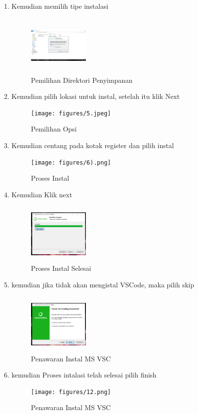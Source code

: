 \begin{enumerate}
    \item Kemudian memilih tipe instalasi
    \begin{figure}[!htbp]
        \centering
        \includegraphics[width=3cm,height=3cm]{figures/4.png}
        \caption{Pemilihan Direktori Penyimpanan}
        \label{Directory}
        \end{figure}

    \item Kemudian pilih lokasi untuk instal, setelah itu klik Next
    \begin{figure}[!htbp]
        \centering
        \texttt{[image: figures/5.jpeg]}
        \caption{Pemilihan Opsi}
        \label{opsi}
        \end{figure}

    \item Kemudian centang pada kotak register dan pilih instal
    \begin{figure}[!htbp]
        \centering
        \texttt{[image: figures/6).png]}
        \caption{Proses Instal}
        \label{Proses}
        \end{figure}

    \item Kemudian Klik next
    \begin{figure}[!htbp]
        \centering
        \includegraphics[width=3cm,height=3cm]{figures/7.png}
        \caption{Proses Instal Selesai}
        \label{Proses}
        \end{figure}

    \item kemudian jika tidak akan mengistal VSCode, maka pilih skip
    \begin{figure}[!htbp]
        \centering
        \includegraphics[width=3cm,height=3cm]{figures/9.png}
        \caption{Penawaran Instal MS VSC}
        \label{offering}
        \end{figure}
        \item kemudian Proses intalasi telah selesai pilih finish
    \begin{figure}[!htbp]
        \centering
        \texttt{[image: figures/12.png]}
        \caption{Penawaran Instal MS VSC}
        \label{offering}
        \end{figure}
\end{enumerate}
